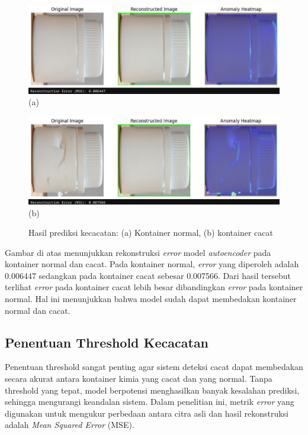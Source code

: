 \begin{figure}[H]
  \centering
  \begin{minipage}{0.8\textwidth}
    \centering
    \includegraphics[width=\textwidth]{gambar/kontainer_bagus.jpeg}
    (a)
  \end{minipage}
  \vspace{1em}

  \begin{minipage}{0.8\textwidth}
    \centering
    \includegraphics[width=\textwidth]{gambar/kontainer_cacat.jpeg}
    (b)
  \end{minipage}
  \caption{Hasil prediksi kecacatan: (a) Kontainer normal, (b) kontainer cacat}
  \label{fig:autoencoder-test}
  \vspace{-1em}
\end{figure}

Gambar di atas menunjukkan rekonstruksi \textit{error} model
\textit{autoencoder} pada kontainer normal dan cacat. Pada kontainer
normal, \textit{error} yang diperoleh adalah 0.006447 sedangkan pada
kontainer cacat sebesar 0.007566. Dari hasil tersebut terlihat
\textit{error} pada kontainer cacat lebih besar dibandingkan
\textit{error} pada kontainer normal. Hal ini menunjukkan bahwa model
sudah dapat membedakan kontainer normal dan cacat.

\vspace{1em}

\subsection{Penentuan Threshold Kecacatan}
Penentuan threshold sangat penting agar sistem deteksi cacat dapat
membedakan secara akurat antara kontainer kimia yang cacat dan yang
normal. Tanpa threshold yang tepat, model berpotensi menghasilkan
banyak kesalahan prediksi, sehingga mengurangi keandalan sistem.
Dalam penelitian
ini, metrik \textit{error} yang digunakan untuk mengukur perbedaan antara
citra asli dan hasil rekonstruksi adalah \textit{Mean Squared Error} (MSE).

